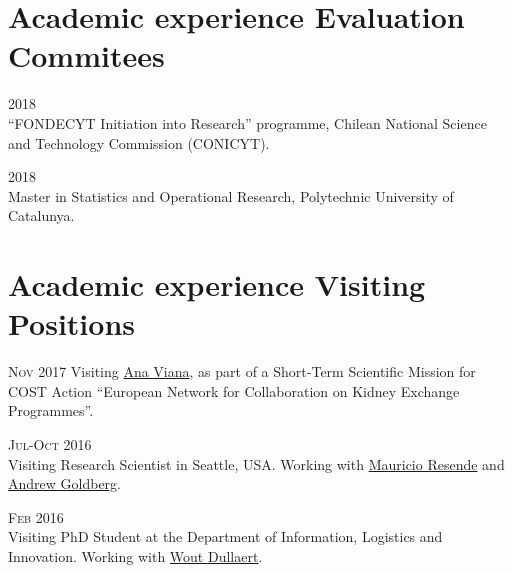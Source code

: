 \section*{Academic experience {\small Evaluation Commitees}}

\begin{paracol}{2}
  \textsc{2018}
\switchcolumn
  \\
  ``FONDECYT Initiation into Research'' programme, Chilean National Science and Technology Commission (CONICYT).
\end{paracol}

\begin{paracol}{2}
  \textsc{2018}
\switchcolumn
  \\
  Master in Statistics and Operational Research, Polytechnic University of Catalunya.
\end{paracol}

\section*{Academic experience {\small Visiting Positions}}

\begin{paracol}{2}
  \textsc{Nov 2017}
\switchcolumn
  Visiting \href{https://scholar.google.com/citations?user=RW7QevYAAAAJ}{Ana Viana}, as part of a Short-Term Scientific Mission for COST Action ``European Network for Collaboration on Kidney Exchange Programmes''.
\end{paracol}

\begin{paracol}{2}
  \textsc{Jul-Oct 2016}
\switchcolumn
  \\
  Visiting Research Scientist in Seattle, USA. Working with \href{https://scholar.google.com/citations?user=KTmPx50AAAAJ}{Mauricio Resende} and \href{https://scholar.google.it/citations?user=U5iFVowAAAAJ}{Andrew Goldberg}.
\end{paracol}

\begin{paracol}{2}
  \textsc{Feb 2016}
\switchcolumn
  \\
  Visiting PhD Student at the Department of Information, Logistics and Innovation. Working with \href{https://scholar.google.com/citations?user=wjjCd5UAAAAJ}{Wout Dullaert}.
\end{paracol}

